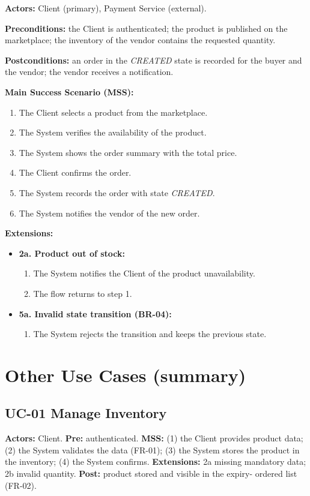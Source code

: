 \textbf{Actors:} Client (primary), Payment Service (external).

\textbf{Preconditions:} the Client is authenticated; the product is published
on the marketplace; the inventory of the vendor contains the requested
quantity.

\textbf{Postconditions:} an order in the \emph{CREATED} state is recorded for
the buyer and the vendor; the vendor receives a notification.

\textbf{Main Success Scenario (MSS):}
\begin{enumerate}
    \item The Client selects a product from the marketplace.
    \item The System verifies the availability of the product.
    \item The System shows the order summary with the total price.
    \item The Client confirms the order.
    \item The System records the order with state \emph{CREATED}.
    \item The System notifies the vendor of the new order.
\end{enumerate}

\textbf{Extensions:}
\begin{itemize}
    \item \textbf{2a. Product out of stock:}
    \begin{enumerate}
        \item The System notifies the Client of the product unavailability.
        \item The flow returns to step 1.
    \end{enumerate}
    \item \textbf{5a. Invalid state transition (BR-04):}
    \begin{enumerate}
        \item The System rejects the transition and keeps the previous state.
    \end{enumerate}
\end{itemize}

\section{Other Use Cases (summary)}

\subsection*{UC-01 Manage Inventory}
\textbf{Actors:} Client. \textbf{Pre:} authenticated.
\textbf{MSS:} (1) the Client provides product data; (2) the System validates
the data (FR-01); (3) the System stores the product in the inventory;
(4) the System confirms. \textbf{Extensions:} 2a missing mandatory data; 2b
invalid quantity. \textbf{Post:} product stored and visible in the expiry-
ordered list (FR-02).

